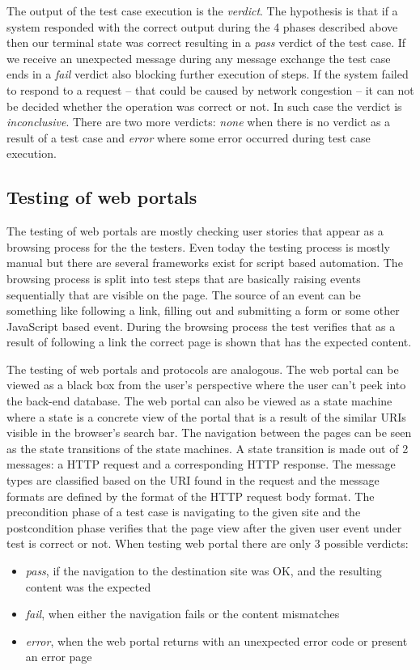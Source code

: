 \documentclass[a4paper]{article}
\begin{document}
The output of the test case execution is the \emph{verdict}. The hypothesis is that if a system responded with the correct output during the 4 phases described above then our terminal state was correct resulting in a \emph{pass} verdict of the test case. If we receive an unexpected message during any message exchange the test case ends in a \emph{fail} verdict also blocking further execution of steps. If the system failed to respond to a request -- that could be caused by network congestion -- it can not be decided whether the operation was correct or not. In such case the verdict is \emph{inconclusive}. There are two more verdicts: \emph{none} when there is no verdict as a result of a test case and \emph{error} where some error occurred during test case execution.


\subsection{Testing of web portals}

The testing of web portals are mostly checking user stories that appear as a browsing process for the the testers. Even today the testing process is mostly manual but there are several frameworks exist for script based automation. The browsing process is split into test steps that are basically raising events sequentially that are visible on the page. The source of an event can be something like following a link, filling out and submitting a form or some other JavaScript based event. During the browsing process the test verifies that as a result of following a link the correct page is shown that has the expected content.

The testing of web portals and protocols are analogous. The web portal can be viewed as a black box from the user's perspective where the user can't peek into the back-end database. The web portal can also be viewed as a state machine where a state is a concrete view of the portal that is a result of the similar URIs visible in the browser's search bar. The navigation between the pages can be seen as the state transitions of the state machines. A state transition is made out of 2 messages: a HTTP request and a corresponding HTTP response. The message types are classified based on the URI found in the request and the message formats are defined by the format of the HTTP request body format. The precondition phase of a test case is navigating to the given site  and the postcondition phase verifies that the page view after the given user event under test is correct or not.
When testing web portal there are only 3 possible verdicts:
\begin{itemize}
  \item \emph{pass}, if the navigation to the destination site was OK, and the resulting content was the expected
  \item \emph{fail}, when either the navigation fails or the content mismatches
  \item \emph{error}, when the web portal returns with an unexpected error code or present an error page
\end{itemize}
\end{document}
